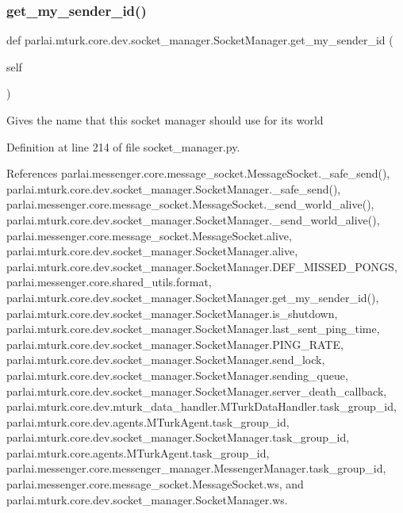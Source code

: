 \subsubsection{\texorpdfstring{get\+\_\+my\+\_\+sender\+\_\+id()}{get\_my\_sender\_id()}}
{\footnotesize\ttfamily def parlai.\+mturk.\+core.\+dev.\+socket\+\_\+manager.\+Socket\+Manager.\+get\+\_\+my\+\_\+sender\+\_\+id (\begin{DoxyParamCaption}\item[{}]{self }\end{DoxyParamCaption})}

\begin{DoxyVerb}Gives the name that this socket manager should use for its world\end{DoxyVerb}
 

Definition at line 214 of file socket\+\_\+manager.\+py.



References parlai.\+messenger.\+core.\+message\+\_\+socket.\+Message\+Socket.\+\_\+safe\+\_\+send(), parlai.\+mturk.\+core.\+dev.\+socket\+\_\+manager.\+Socket\+Manager.\+\_\+safe\+\_\+send(), parlai.\+messenger.\+core.\+message\+\_\+socket.\+Message\+Socket.\+\_\+send\+\_\+world\+\_\+alive(), parlai.\+mturk.\+core.\+dev.\+socket\+\_\+manager.\+Socket\+Manager.\+\_\+send\+\_\+world\+\_\+alive(), parlai.\+messenger.\+core.\+message\+\_\+socket.\+Message\+Socket.\+alive, parlai.\+mturk.\+core.\+dev.\+socket\+\_\+manager.\+Socket\+Manager.\+alive, parlai.\+mturk.\+core.\+dev.\+socket\+\_\+manager.\+Socket\+Manager.\+D\+E\+F\+\_\+\+M\+I\+S\+S\+E\+D\+\_\+\+P\+O\+N\+GS, parlai.\+messenger.\+core.\+shared\+\_\+utils.\+format, parlai.\+mturk.\+core.\+dev.\+socket\+\_\+manager.\+Socket\+Manager.\+get\+\_\+my\+\_\+sender\+\_\+id(), parlai.\+mturk.\+core.\+dev.\+socket\+\_\+manager.\+Socket\+Manager.\+is\+\_\+shutdown, parlai.\+mturk.\+core.\+dev.\+socket\+\_\+manager.\+Socket\+Manager.\+last\+\_\+sent\+\_\+ping\+\_\+time, parlai.\+mturk.\+core.\+dev.\+socket\+\_\+manager.\+Socket\+Manager.\+P\+I\+N\+G\+\_\+\+R\+A\+TE, parlai.\+mturk.\+core.\+dev.\+socket\+\_\+manager.\+Socket\+Manager.\+send\+\_\+lock, parlai.\+mturk.\+core.\+dev.\+socket\+\_\+manager.\+Socket\+Manager.\+sending\+\_\+queue, parlai.\+mturk.\+core.\+dev.\+socket\+\_\+manager.\+Socket\+Manager.\+server\+\_\+death\+\_\+callback, parlai.\+mturk.\+core.\+dev.\+mturk\+\_\+data\+\_\+handler.\+M\+Turk\+Data\+Handler.\+task\+\_\+group\+\_\+id, parlai.\+mturk.\+core.\+dev.\+agents.\+M\+Turk\+Agent.\+task\+\_\+group\+\_\+id, parlai.\+mturk.\+core.\+dev.\+socket\+\_\+manager.\+Socket\+Manager.\+task\+\_\+group\+\_\+id, parlai.\+mturk.\+core.\+agents.\+M\+Turk\+Agent.\+task\+\_\+group\+\_\+id, parlai.\+messenger.\+core.\+messenger\+\_\+manager.\+Messenger\+Manager.\+task\+\_\+group\+\_\+id, parlai.\+messenger.\+core.\+message\+\_\+socket.\+Message\+Socket.\+ws, and parlai.\+mturk.\+core.\+dev.\+socket\+\_\+manager.\+Socket\+Manager.\+ws.



